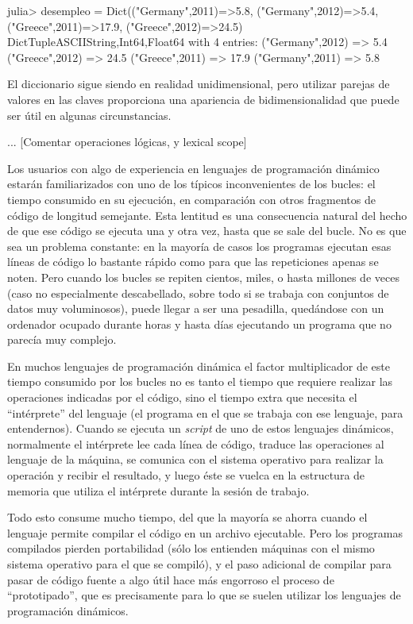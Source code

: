 ﻿\documentclass{article}
\begin{document}
{julia> desempleo = Dict(("Germany",2011)=>5.8, ("Germany",2012)=>5.4,
       ("Greece",2011)=>17.9, ("Greece",2012)=>24.5)
Dict{Tuple{ASCIIString,Int64},Float64} with 4 entries:
  ("Germany",2012) => 5.4
  ("Greece",2012)  => 24.5
  ("Greece",2011)  => 17.9
  ("Germany",2011) => 5.8

El diccionario sigue siendo en realidad unidimensional, pero utilizar parejas de valores en las claves proporciona una apariencia de bidimensionalidad que puede ser útil en algunas circunstancias.




...
[Comentar operaciones lógicas, y lexical scope]

Los usuarios con algo de experiencia en lenguajes de programación
dinámico estarán familiarizados con uno de los típicos inconvenientes
de los bucles: el tiempo consumido en su ejecución, en comparación con otros
fragmentos de código de longitud semejante. Esta lentitud es una
consecuencia natural del hecho de que ese código se ejecuta una y otra vez,
hasta que se sale del bucle. No es que sea un problema constante:
en la mayoría de casos los programas ejecutan esas líneas de código lo
bastante rápido como para que las repeticiones apenas se noten. Pero
cuando los bucles se repiten cientos, miles, o hasta millones de veces
(caso no especialmente descabellado, sobre todo si se trabaja con
conjuntos de datos muy voluminosos), puede llegar a ser una pesadilla,
quedándose con un ordenador ocupado durante horas y hasta días
ejecutando un programa que no parecía muy complejo.

En muchos lenguajes de programación dinámica
el factor multiplicador de este tiempo consumido por los bucles no
es tanto el tiempo que requiere realizar las operaciones indicadas por
el código, sino el tiempo extra que necesita el ``intérprete'' del lenguaje
(el programa en el que se trabaja con ese lenguaje, para entendernos).
Cuando se ejecuta un \emph{script} de uno de estos lenguajes dinámicos,
normalmente el intérprete lee cada línea de código, traduce las operaciones al
lenguaje de la máquina, se comunica con el sistema operativo para
realizar la operación y recibir el resultado, y luego éste se vuelca en la
estructura de memoria que utiliza el intérprete durante la sesión de trabajo.

Todo esto consume mucho tiempo, del que la mayoría se ahorra cuando el lenguaje
permite compilar el código en un archivo ejecutable. Pero los programas
compilados pierden portabilidad (sólo los entienden máquinas con el
mismo sistema operativo para el que se compiló), y el paso adicional
de compilar para pasar de código fuente a algo útil hace más engorroso
el proceso de ``prototipado'', que es precisamente para lo que se suelen
utilizar los lenguajes de programación dinámicos.

}
\end{document}
